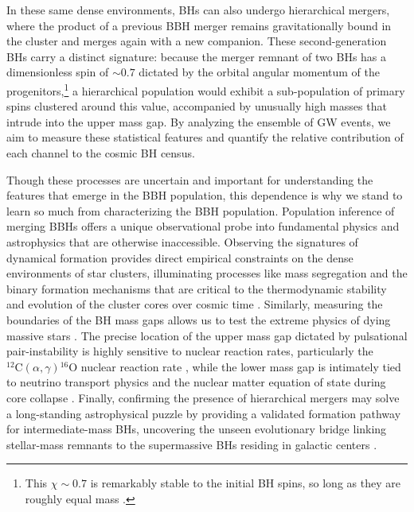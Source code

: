 \begin{refsection}
In these same dense environments, \acp{BH} can also undergo hierarchical mergers, where the product of a previous \ac{BBH} merger remains gravitationally bound in the cluster and merges again with a new companion. These second-generation \acp{BH} carry a distinct signature: because the merger remnant of two \acp{BH} has a dimensionless spin of $\sim 0.7$ dictated by the orbital angular momentum of the progenitors,\footnote{This $\chi\sim 0.7$ is remarkably stable to the initial \ac{BH} spins, so long as they are roughly equal mass \citep{pretorius_evolution_2005, buonanno_inspiral_2007, borchers_gravitational-wave_2025}.} a hierarchical population would exhibit a sub-population of primary spins clustered around this value, accompanied by unusually high masses that intrude into the upper mass gap. By analyzing the ensemble of \ac{GW} events, we aim to measure these statistical features and quantify the relative contribution of each channel to the cosmic \ac{BH} census.

Though these processes are uncertain and important for understanding the features that emerge in the \ac{BBH} population, this dependence is why we stand to learn so much from characterizing the \ac{BBH} population. Population inference of merging \acp{BBH} offers a unique observational probe into fundamental physics and astrophysics that are otherwise inaccessible. Observing the signatures of dynamical formation provides direct empirical constraints on the dense environments of star clusters, illuminating processes like mass segregation and the binary formation mechanisms that are critical to the thermodynamic stability and evolution of the cluster cores over cosmic time \citep{spitzer_equipartition_1969, 1993Natur.364..421K}. Similarly, measuring the boundaries of the \ac{BH} mass gaps allows us to test the extreme physics of dying massive stars \citep{woosley_pair-instability_2021}. The precise location of the upper mass gap dictated by pulsational pair-instability is highly sensitive to nuclear reaction rates, particularly the ${}^{12}\mathrm{C}(\alpha, \gamma){}^{16}\mathrm{O}$ nuclear reaction rate \citep{farmer_mind_2019}, while the lower mass gap is intimately tied to neutrino transport physics and the nuclear matter equation of state during core collapse \citep{sukhbold_core-collapse_2016}. Finally, confirming the presence of hierarchical mergers may solve a long-standing astrophysical puzzle by providing a validated formation pathway for intermediate-mass \acp{BH}, uncovering the unseen evolutionary bridge linking stellar-mass remnants to the supermassive \acp{BH} residing in galactic centers \citep{PortegiesZwart:2002iks, greene_intermediate-mass_2020}.


\end{refsection}
